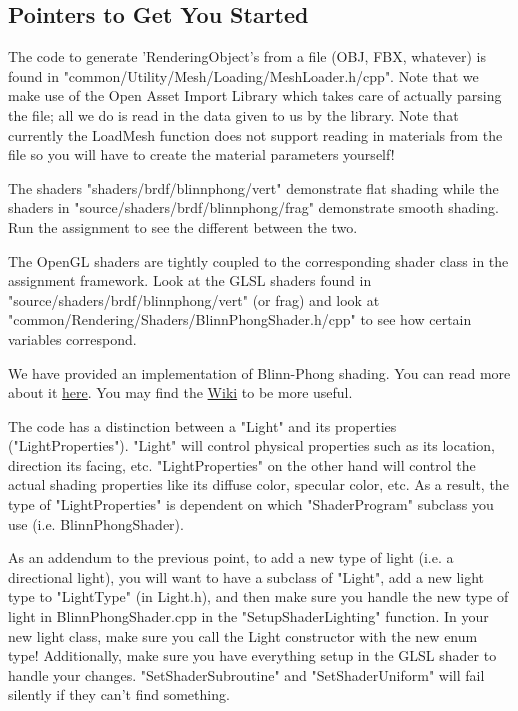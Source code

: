 \documentclass{article}
\begin{document}
\subsection*{Pointers to Get You Started}
\begin{itemize*}
    \item The code to generate 'RenderingObject's from a file (OBJ, FBX, whatever) is found in "common/Utility/Mesh/Loading/MeshLoader.h/cpp". Note that we make use of the Open Asset Import Library which takes care of actually parsing the file; all we do is read in the data given to us by the library. Note that currently the LoadMesh function does not support reading in materials from the file so you will have to create the material parameters yourself!
    \item The shaders "shaders/brdf/blinnphong/vert" demonstrate flat shading while the shaders in "source/shaders/brdf/blinnphong/frag" demonstrate smooth shading. Run the assignment to see the different between the two.
    \item The OpenGL shaders are tightly coupled to the corresponding shader class in the assignment framework. Look at the GLSL shaders found in "source/shaders/brdf/blinnphong/vert" (or frag) and look at "common/Rendering/Shaders/BlinnPhongShader.h/cpp" to see how certain variables correspond.
    \item We have provided an implementation of Blinn-Phong shading. You can read more about it \href{http://citeseerx.ist.psu.edu/viewdoc/download?doi=10.1.1.131.7741&rep=rep1&type=pdf}{here}. You may find the \href{https://en.wikipedia.org/wiki/Blinn%E2%80%93Phong_shading_model}{Wiki} to be more useful.
    \item The code has a distinction between a "Light" and its properties ("LightProperties"). "Light" will control physical properties such as its location, direction its facing, etc. "LightProperties" on the other hand will control the actual shading properties like its diffuse color, specular color, etc. As a result,  the type of "LightProperties" is dependent on which "ShaderProgram" subclass you use (i.e. BlinnPhongShader).
    \item As an addendum to the previous point, to add a new type of light (i.e. a directional light), you will want to have a subclass of "Light", add a new light type to "LightType" (in Light.h), and then make sure you handle the new type of light in BlinnPhongShader.cpp in the "SetupShaderLighting" function. In your new light class, make sure you call the Light constructor with the new enum type! Additionally, make sure you have everything setup in the GLSL shader to handle your changes. "SetShaderSubroutine" and "SetShaderUniform" will fail silently if they can't find something.
\end{itemize*}
\end{document}
